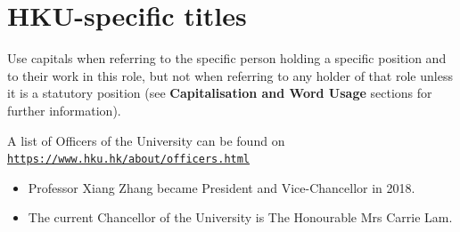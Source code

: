 \documentclass[11pt,a4paper]{book}
\newcommand{\cmark}{{\color{green(html/cssgreen)}\checkmark}}%
\begin{document}
	\section{HKU-specific titles}
	Use capitals when referring to the specific person holding a specific position and to their work in this role, but not when referring to any holder of that role unless it is a statutory position (see \textbf{Capitalisation and Word Usage} sections for further information).\par
	A list of Officers of the University can be found on \texttt{\url{https://www.hku.hk/about/officers.html}}
	{\firasans \begin{mdframed}[backgroundcolor=aliceblue] \begin{itemize}[label=\cmark]
		\item Professor Xiang Zhang became President and Vice-Chancellor in 2018.
		\item The current Chancellor of the University is The Honourable Mrs Carrie Lam.
	\end{itemize} \end{mdframed} }
\end{document}
